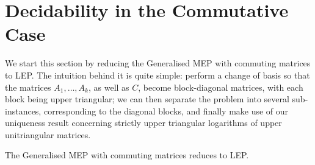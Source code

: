 \section{Decidability in the Commutative Case}

We start this section by reducing the Generalised MEP with commuting
matrices to LEP.  The intuition behind it is quite simple: perform a
change of basis so that the matrices $A_{1}, \ldots, A_{k}$, as well
as $C$, become block-diagonal matrices, with each block being upper
triangular; we can then separate the problem into several
sub-instances, corresponding to the diagonal blocks, and finally make
use of our uniqueness result concerning strictly upper triangular
logarithms of upper unitriangular matrices.

\begin{theorem}
  The Generalised MEP with commuting matrices reduces to LEP.
\end{theorem}

